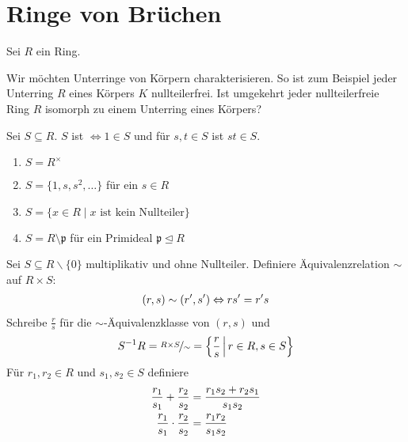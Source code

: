 \section{Ringe von Brüchen}

Sei $R$ ein Ring.

\begin{remark}
	Wir möchten Unterringe von Körpern charakterisieren. So ist zum Beispiel jeder Unterring $R$ eines Körpers $K$ nullteilerfrei. Ist umgekehrt jeder nullteilerfreie Ring $R$ isomorph zu einem Unterring eines Körpers?
\end{remark}

\begin{definition}[multiplikativ]
	Sei $S \subseteq R$. $S$ ist  $\Leftrightarrow 1 \in S$ und für $s,t \in S$ ist $st \in S$. 
\end{definition}

\begin{example}
	\begin{enumerate}[label=(\alph*)]
		\item $S = R^{\times}$
		\item $S = \{ 1, s, s^2, \dots \}$ für ein $s \in R$
		\item $S = \{ x \in R \mid x \text{ ist kein Nullteiler} \}$
		\item $S = R \setminus \mathfrak{p}$ für ein Primideal $\mathfrak{p} \unlhd R$
	\end{enumerate}
\end{example}

\begin{definition}
	Sei $S \subseteq R\backslash \{0\}$ multiplikativ und ohne Nullteiler. Definiere Äquivalenzrelation $\sim$ auf $R \times S$:
	\begin{align}
		(r,s) \sim (r', s') \Leftrightarrow r s' = r's\notag 
	\end{align}
	Schreibe $\frac{r}{s}$ für die $\sim$-Äquivalenzklasse von $(r,s)$ und 
	\begin{align}
		S^{-1}R = \nicefrac{R\times S}{\sim} = \left\{ \frac{r}{s} \,\Big\vert\, r \in R,s \in S\right\}\notag	
	\end{align}
	Für $r_1,r_2 \in R$ und $s_1, s_2 \in S$ definiere
	\begin{align}
		\frac{r_1}{s_1} + \frac{r_2}{s_2} &= \frac{r_1 s_2 + r_2 s_1}{s_1 s_2} \notag \\
		\frac{r_1}{s_1} \cdot \frac{r_2}{s_2} &= \frac{r_1 r_2}{s_1 s_2} \notag
	\end{align}
\end{definition}

